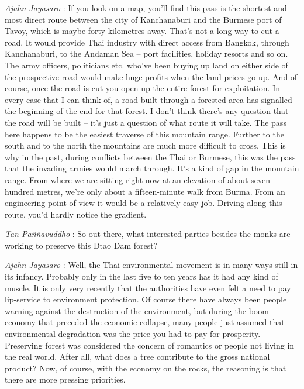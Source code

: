 \emph{Ajahn Jayasāro }: If you look on a map, you'll find this pass is
the shortest and most direct route between the city of Kanchanaburi and
the Burmese port of Tavoy, which is maybe forty kilometres away. That's
not a long way to cut a road. It would provide Thai industry with direct
access from Bangkok, through Kanchanaburi, to the Andaman Sea -- port
facilities, holiday resorts and so on. The army officers, politicians
etc. who've been buying up land on either side of the prospective road
would make huge profits when the land prices go up. And of course, once
the road is cut you open up the entire forest for exploitation. In every
case that I can think of, a road built through a forested area has
signalled the beginning of the end for that forest. I don't think
there's any question that the road will be built -- it's just a
question of what route it will take. The pass here happens to be the
easiest traverse of this mountain range. Further to the south and to the
north the mountains are much more difficult to cross. This is why in the
past, during conflicts between the Thai or Burmese, this was the pass
that the invading armies would march through. It's a kind of gap in the
mountain range. From where we are sitting right now at an elevation of
about seven hundred metres, we're only about a fifteen-minute walk from
Burma. From an engineering point of view it would be a relatively easy
job. Driving along this route, you'd hardly notice the gradient.

\emph{Tan Paññāvuddho} : So out there, what interested parties besides
the monks are working to preserve this Dtao Dam forest?

\emph{Ajahn Jayasāro }: Well, the Thai environmental movement is in many
ways still in its infancy. Probably only in the last five to ten years
has it had any kind of muscle. It is only very recently that the
authorities have even felt a need to pay lip-service to environment
protection. Of course there have always been people warning against the
destruction of the environment, but during the boom economy that
preceded the economic collapse, many people just assumed that
environmental degradation was the price you had to pay for prosperity.
Preserving forest was considered the concern of romantics or people not
living in the real world. After all, what does a tree contribute to the
gross national product? Now, of course, with the economy on the rocks,
the reasoning is that there are more pressing priorities.

